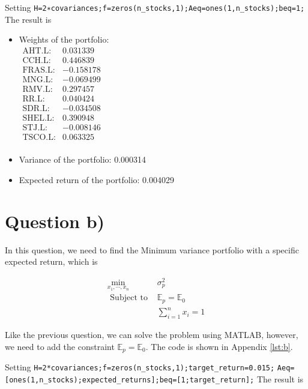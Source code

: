 \documentclass[12pt]{article}
\begin{document}
Setting \verb|H=2∗covariances;f=zeros(n_stocks,1);Aeq=ones(1,n_stocks);beq=1;|
The result is

\begin{itemize}
    \item Weights of the portfolio: \\ \(
          \begin{array}{rr}
              \text{AHT.L:}  & 0.031339  \\
              \text{CCH.L:}  & 0.446839  \\
              \text{FRAS.L:} & -0.158178 \\
              \text{MNG.L:}  & -0.069499 \\
              \text{RMV.L:}  & 0.297457  \\
              \text{RR.L:}   & 0.040424  \\
              \text{SDR.L:}  & -0.034508 \\
              \text{SHEL.L:} & 0.390948  \\
              \text{STJ.L:}  & -0.008146 \\
              \text{TSCO.L:} & 0.063325  \\
          \end{array}
          \)
    \item Variance of the portfolio: 0.000314
    \item Expected return of the portfolio: 0.004029
\end{itemize}

\section{Question b)}

In this question, we need to find the Minimum variance portfolio with a
specific expected return, which is

\[\begin{aligned}
        \min _{x_1, \cdots, x_n} & \sigma_p^2                \\
        \text { Subject to }     & \mathbb{E}_p=\mathbb{E}_0 \\
                                 & \sum_{i=1}^n x_i=1
    \end{aligned}\]

Like the previous question, we can solve the problem using MATLAB, however, we
need to add the constraint \(\mathbb{E}_p=\mathbb{E}_0\). The code is shown in
Appendix \ref{lst:b}.

Setting \verb|H=2*covariances;f=zeros(n_stocks,1);target_return=0.015;|
\verb|Aeq=[ones(1,n_stocks);expected_returns];beq=[1;target_return];| The
result is
\end{document}
